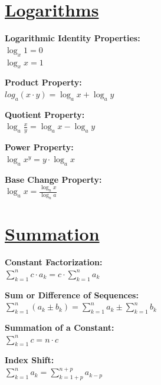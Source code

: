 \documentclass[12pt]{article}
\begin{document}
\section*{\underline{\textbf{Logarithms}}}
\begin{minipage}{\textwidth}
    \textbf{Logarithmic Identity Properties:}
    \\ \( \log_x{1} = 0 \)
    \\ \( \log_x{x} = 1 \)
\end{minipage}
\begin{minipage}{\textwidth}
    \textbf{Product Property:}
    \\ \( log_a{(x \cdot y)} = \log_a{x} + \log_a{y} \)
\end{minipage}
\begin{minipage}{\textwidth}
    \textbf{Quotient Property:}
    \\ \( \log_a{\displaystyle\frac{ x }{ y }} = \log_a{x} - \log_a{y} \)
\end{minipage}
\begin{minipage}{\textwidth}
    \textbf{Power Property:}
    \\ \( \log_a{x^y} = y \cdot \log_a{x} \)
\end{minipage}
\begin{minipage}{\textwidth}
    \textbf{Base Change Property:}
    \\ \( \log_a{x} = \displaystyle\frac{ \log_n{x} }{ \log_n{a} } \)
\end{minipage}



\section*{\underline{\textbf{Summation}}}
\begin{minipage}{\textwidth}
    \textbf{Constant Factorization:}
    \\ \( \displaystyle\sum_{k=1}^{n} {c \cdot a_k } = c \cdot \displaystyle\sum_{k=1}^{n} { a_k } \)
\end{minipage}
\begin{minipage}{\textwidth}
    \textbf{Sum or Difference of Sequences:}
    \\ \( \displaystyle\sum_{k = 1}^{n} {(a_k \pm b_k)} = \displaystyle\sum_{k = 1}^{n} {a_k} \pm \displaystyle\sum_{k = 1}^{n} {b_k} \)
\end{minipage}
\begin{minipage}{\textwidth}
    \textbf{Summation of a Constant:}
    \\ \( \displaystyle\sum_{k = 1}^{n} {c} = n \cdot c \)
\end{minipage}
\begin{minipage}{\textwidth}
    \textbf{Index Shift:}
    \\ \( \displaystyle\sum_{k = 1}^{n} {a_k} = \displaystyle\sum_{k = 1 + p}^{n + p} {a_{k-p}} \)
\end{minipage}
\end{document}
